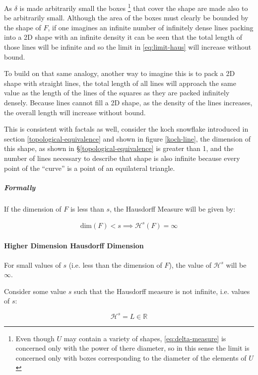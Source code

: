 \documentclass[a4paper,11pt,twoside]{article}
\begin{document}
As \(\delta\) is made arbitrarily small the boxes \footnote{Even though \(U\) may contain a variety of shapes, \eqref{eq:delta-measure} is concerned only with the power of there diameter, so in this sense the limit is concerned only with boxes corresponding to the diameter of the elements of \(U\)} that cover the shape are made also to be arbitrarily small. Although the area of the boxes must clearly be bounded by the shape of \(F\), if one imagines an infinite number of infinitely dense lines packing into a 2D shape with an infinite density it can be seen that the total length of those lines will be infinite and so the limit in \eqref{eq:limit-haus} will increase without bound.

To build on that same analogy, another way to imagine this is to pack a 2D shape with straight lines, the total length of all lines will approach the same value as the length of the lines of the squares as they are packed infinitely densely. Because lines cannot fill a 2D shape, as the density of the lines increases, the overall length will increase without bound.

This is consistent with factals as well, consider the koch snowflake introduced in section \ref{topological-equivalence} and shown in figure \ref{koch-line}, the dimension of this shape, as shown in \S \ref{topological-equivalence} is greater than 1, and the number of lines necessary to describe that shape is also infinite because every point of the ``curve'' is a point of an equilateral triangle.

\subparagraph{Formally}
\label{sec:org79c7d28}
If the dimension of \(F\) is less than \(s\), the Hausdorff Measure will be given by:

\begin{align}
\mathrm{dim}\left(  F \right ) < s \implies \mathcal{H}^{s} \left( F \right)  = \infty
\end{align}

\paragraph{Higher Dimension Hausdorff Dimension}
\label{sec:orgfcb3b4d}


For small values of \(s\) (i.e. less than the dimension of  \(F\)), the value of \(\mathcal{H}^s\)  will be \(\infty\).

Consider some value \(s\) such that the Hausdorff measure is not infinite, i.e. values of \(s\):

\[
\mathcal{H}^s = L \in \mathbb{R}
\]
\end{document}
